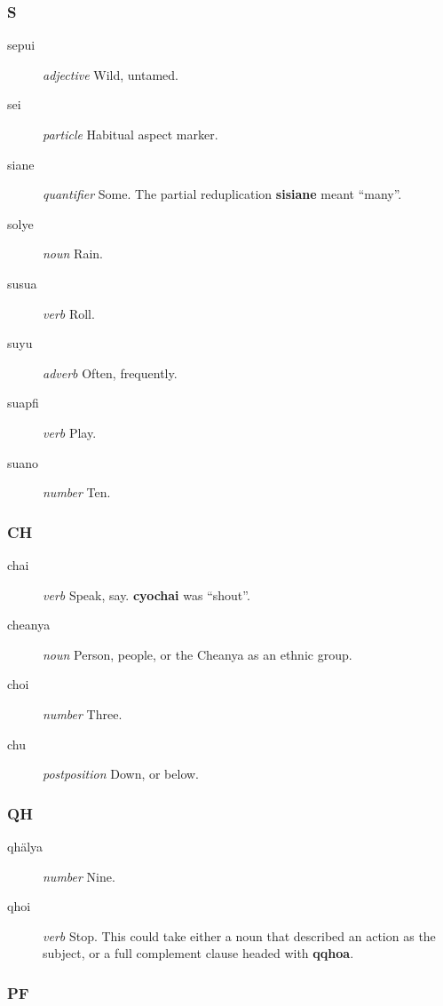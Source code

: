 \documentclass{article}
\begin{document}
\subsubsection{S}

\begin{description}
\item [sepui] \emph{adjective} Wild, untamed.
\item [sei] \emph{particle} Habitual aspect marker.
\item [siane] \emph{quantifier} Some.  The partial reduplication \textbf{sisiane} meant ``many''.
\item [solye] \emph{noun} Rain.
\item [susua] \emph{verb} Roll.
\item [suyu] \emph{adverb} Often, frequently.
\item [suapfi] \emph{verb} Play.
\item [suano] \emph{number} Ten.
\end{description}

\subsubsection{CH}

\begin{description}
\item [chai] \emph{verb} Speak, say.  \textbf{cyochai} was ``shout''.
\item [cheanya] \emph{noun} Person, people, or the Cheanya as an ethnic group.
\item [choi] \emph{number} Three.
\item [chu] \emph{postposition} Down, or below.
\end{description}

\subsubsection{QH}

\begin{description}
\item [qh\"alya] \emph{number} Nine.
\item [qhoi] \emph{verb} Stop.  This could take either a noun that described an action as the subject, or a full complement clause headed with \textbf{qqhoa}.
\end{description}

\subsubsection{PF}
\end{document}
